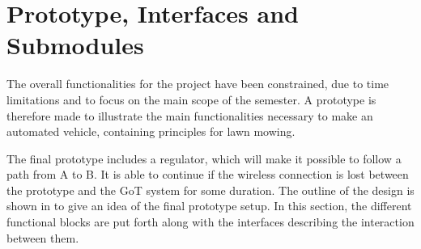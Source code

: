 \section{Prototype, Interfaces and Submodules} \label{Finalprototype}





The overall functionalities for the project have been constrained, due to time limitations and to focus on the main scope of the semester. A prototype is therefore made to illustrate the main functionalities necessary to make an automated vehicle, containing principles for lawn mowing.

The final prototype includes a regulator, which will make it possible to follow a path from A to B. It is able to continue if the wireless connection is lost between the prototype and the GoT system for some duration. The outline of the design is shown in  to give an idea of the final prototype setup. In this section, the different functional blocks are put forth along with the interfaces describing the interaction between them.


